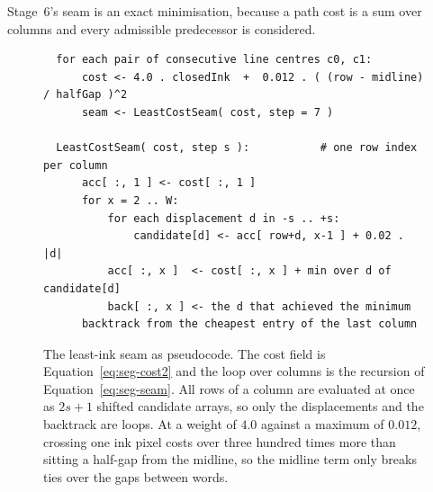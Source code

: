 Stage~6's seam is an exact minimisation, because a path cost is a sum over columns and every admissible predecessor is considered.

\begin{figure}[h]
\centering
\fontsize{8.5}{10.2}\selectfont
\begin{verbatim}
  for each pair of consecutive line centres c0, c1:
      cost <- 4.0 . closedInk  +  0.012 . ( (row - midline) / halfGap )^2
      seam <- LeastCostSeam( cost, step = 7 )

  LeastCostSeam( cost, step s ):           # one row index per column
      acc[ :, 1 ] <- cost[ :, 1 ]
      for x = 2 .. W:
          for each displacement d in -s .. +s:
              candidate[d] <- acc[ row+d, x-1 ] + 0.02 . |d|
          acc[ :, x ]  <- cost[ :, x ] + min over d of candidate[d]
          back[ :, x ] <- the d that achieved the minimum
      backtrack from the cheapest entry of the last column
\end{verbatim}
\caption{The least-ink seam as pseudocode. The cost field is Equation~\ref{eq:seg-cost2} and the loop over columns is the recursion of Equation~\ref{eq:seg-seam}. All rows of a column are evaluated at once as $2s+1$ shifted candidate arrays, so only the displacements and the backtrack are loops. At a weight of $4.0$ against a maximum of $0.012$, crossing one ink pixel costs over three hundred times more than sitting a half-gap from the midline, so the midline term only breaks ties over the gaps between words.}
\label{fig:seg-seampseudo}
\end{figure}
